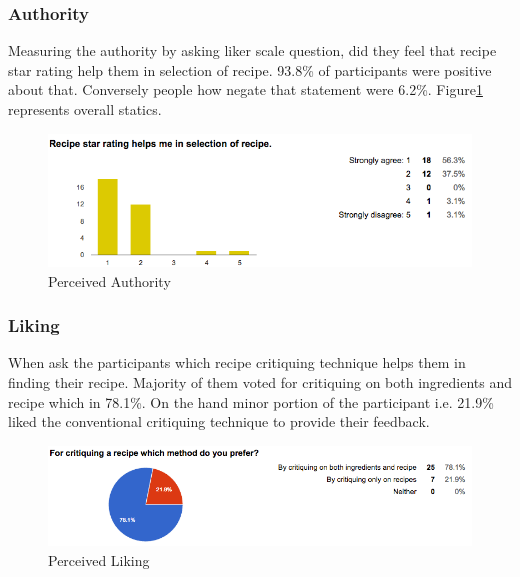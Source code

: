 \subsubsection{Authority}
Measuring the authority by asking liker scale question, did they feel that recipe star rating help them in selection of recipe. 93.8\% of participants were positive about that. Conversely people how negate that statement were 6.2\%. Figure\ref{fig:ch5_stat_authority} represents overall statics. 
\begin{figure}[h]
	\centering
	\includegraphics[width=1\linewidth]{figures/ch5_stat_authority}
	\caption{Perceived Authority}
	\label{fig:ch5_stat_authority}
\end{figure}
\subsubsection{Liking}
When ask the participants which recipe critiquing technique helps them in finding their recipe. Majority of them voted for critiquing on both ingredients and recipe which in 78.1\%. On the hand minor portion of the participant i.e. 21.9\% liked the conventional critiquing technique to provide their feedback.
\begin{figure}[h]
	\centering
	\includegraphics[width=1\linewidth]{figures/ch5_stat_liking.png}
	\caption{Perceived Liking}
	\label{fig:ch5_stat_liking}
\end{figure}
